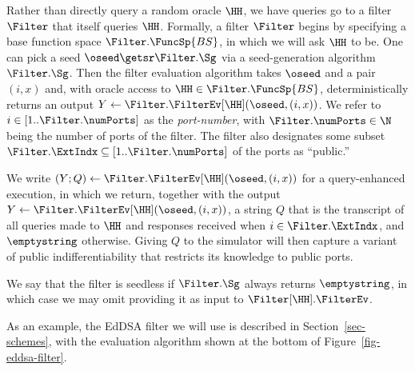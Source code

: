  Rather than directly query a random oracle $\HH$, we have queries go to a filter $\Filter$ that itself queries $\HH$. Formally, a filter $\Filter$ begins by specifying a base function space $\Filter.\FuncSp{BS}$, in which we will ask $\HH$ to be. One can pick a seed $\oseed\getsr  \Filter.\Sg$ via a seed-generation algorithm $\Filter.\Sg$. Then the filter evaluation algorithm takes $\oseed$ and a pair $(i,x)$ and, with oracle access to $\HH \in \Filter.\FuncSp{BS}$, deterministically returns an output $Y \gets \Filter.\FilterEv[\HH](\oseed,(i,x))$. We refer to $i \in [1..\Filter.\numPorts]$ as the \textit{port-number}, with $\Filter.\numPorts \in \N$ being the number of ports of the filter. The filter also designates some subset
$\Filter.\ExtIndx\subseteq [1..\Filter.\numPorts]$ of the ports as ``public.''

We write $(Y;Q) \gets \Filter.\FilterEv[\HH](\oseed,(i,x))$ for a query-enhanced execution, in which we return, together with the output $Y \gets \Filter.\FilterEv[\HH](\oseed,(i,x))$, a string $Q$ that is the transcript of all queries made to $\HH$ and responses received when $i\in\Filter.\ExtIndx$, and $\emptystring$ otherwise.
Giving $Q$ to the simulator will then capture a variant of public indifferentiability that restricts its knowledge to public ports.

We say that the filter is seedless if $\Filter.\Sg$ always returns $\emptystring$, in which case we may omit providing it as input to $\Filter[\HH].\FilterEv$.

As an example, the EdDSA filter we will use is described in Section~\ref{sec-schemes}, with the evaluation algorithm  shown at the bottom of Figure~\ref{fig-eddsa-filter}.


